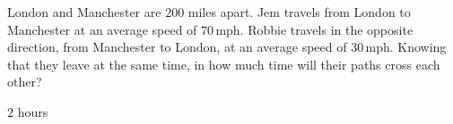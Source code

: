 \begin{tehtavasivu}
\begin{tehtava}
London and Manchester are $200$ miles apart. Jem travels from London to Manchester at an average speed of $70$\,mph. Robbie travels in the opposite direction, from Manchester to London, at an average speed of $30$\,mph. Knowing that they leave at the same time, in how much time will their paths cross each other?
	\begin{vastaus}
		$2$ hours
	\end{vastaus}
\end{tehtava}

%


\end{tehtavasivu}
